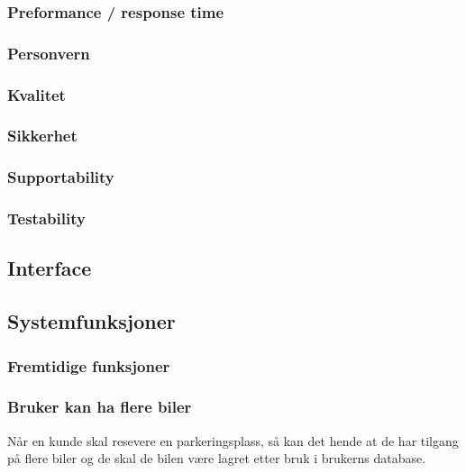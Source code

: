 \documentclass[12pt]{article}
\begin{document}
        \subsubsection{Preformance / response time}


        \subsubsection{Personvern}


        \subsubsection{Kvalitet}


        \subsubsection{Sikkerhet}


        \subsubsection{Supportability}


        \subsubsection{Testability}
        

    \subsection{Interface}

    \subsection{Systemfunksjoner}

        \subsubsection{Fremtidige funksjoner}

            \subsubsection{Bruker kan ha flere biler}
            Når en kunde skal resevere en parkeringsplass, så kan det hende at de har tilgang på flere biler og de skal de bilen være lagret etter bruk i brukerns database.
\end{document}
